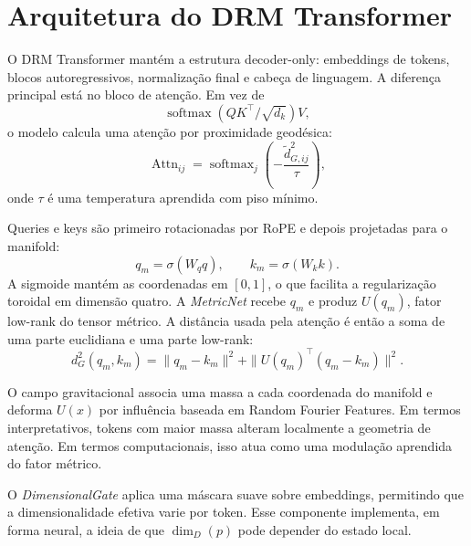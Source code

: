 \section{Arquitetura do DRM Transformer}
\label{sec:arquitetura}

O DRM Transformer mantém a estrutura decoder-only: embeddings de tokens,
blocos autoregressivos, normalização final e cabeça de linguagem. A diferença
principal está no bloco de atenção. Em vez de
\begin{equation}
  \operatorname{softmax}(QK^\top/\sqrt{d_k})V,
\end{equation}
o modelo calcula uma atenção por proximidade geodésica:
\begin{equation}
  \operatorname{Attn}_{ij}
  = \operatorname{softmax}_j\left(-\frac{\tilde{d}_{G,ij}^2}{\tau}\right),
\end{equation}
onde $\tau$ é uma temperatura aprendida com piso mínimo.

Queries e keys são primeiro rotacionadas por RoPE e depois projetadas para o
manifold:
\begin{equation}
  q_m = \sigma(W_q q), \qquad k_m = \sigma(W_k k).
\end{equation}
A sigmoide mantém as coordenadas em $[0,1]$, o que facilita a regularização
toroidal em dimensão quatro. A \emph{MetricNet} recebe $q_m$ e produz
$U(q_m)$, fator low-rank do tensor métrico. A distância usada pela atenção é
então a soma de uma parte euclidiana e uma parte low-rank:
\begin{equation}
  d_G^2(q_m,k_m)=\|q_m-k_m\|^2+
  \|U(q_m)^\top(q_m-k_m)\|^2.
\end{equation}

O campo gravitacional associa uma massa a cada coordenada do manifold e deforma
$U(x)$ por influência baseada em Random Fourier Features. Em termos
interpretativos, tokens com maior massa alteram localmente a geometria de
atenção. Em termos computacionais, isso atua como uma modulação aprendida do
fator métrico.

O \emph{DimensionalGate} aplica uma máscara suave sobre embeddings, permitindo
que a dimensionalidade efetiva varie por token. Esse componente implementa, em
forma neural, a ideia de que $\dim_D(p)$ pode depender do estado local.
